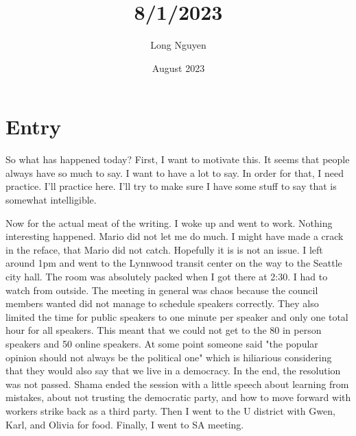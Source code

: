 \documentclass{article}
\title{8/1/2023}
\author{Long Nguyen}
\date{August 2023}
\begin{document}
\maketitle

\section{Entry}
So what has happened today? First, I want to motivate this. It seems that people always have so much to say. I want to have a lot to say. In order for that, I need practice. I'll practice here. I'll try to make sure I have some stuff to say that is somewhat intelligible.

Now for the actual meat of the writing. I woke up and went to work. Nothing interesting happened. Mario did not let me do much. I might have made a crack in the reface, that Mario did not catch. Hopefully it is is not an issue. I left around 1pm and went to the Lynnwood transit center on the way to the Seattle city hall. The room was absolutely packed when I got there at 2:30. I had to watch from outside. The meeting in general was chaos because the council members wanted did not manage to schedule speakers correctly. They also limited the time for public speakers to one minute per speaker and only one total hour for all speakers. This meant that we could not get to the 80 in person speakers and 50 online speakers. At some point someone said "the popular opinion should not always be the political one" which is hiliarious considering that they would also say that we live in a democracy. In the end, the resolution was not passed. Shama ended the session with a little speech about learning from mistakes, about not trusting the democratic party, and how to move forward with workers strike back as a third party. Then I went to the U district with Gwen, Karl, and Olivia for food. Finally, I went to SA meeting.
\end{document}

